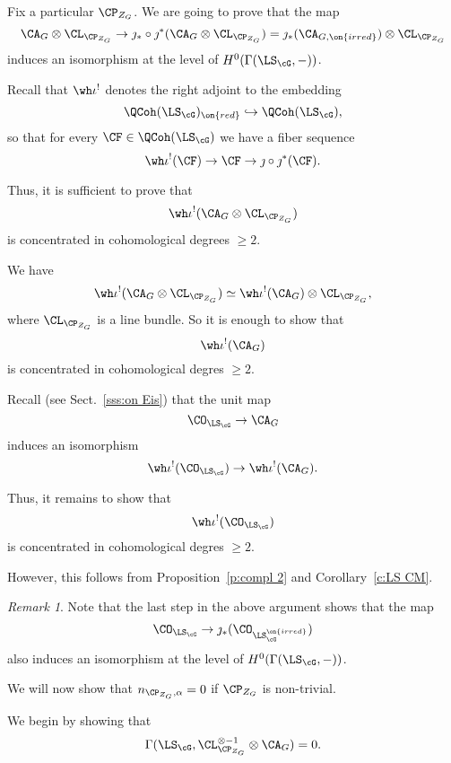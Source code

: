 \documentclass[9pt]{amsart}
\theoremstyle{remark}
\newtheorem{rem}[subsubsection]{Remark}
\theoremstyle{definition}
\theoremstyle{remark}
\newcommand{\secref}[1]{Sect.~\ref{#1}}
\newcommand{\propref}[1]{Proposition~\ref{#1}}
\newcommand{\corref}[1]{Corollary~\ref{#1}}
\numberwithin{equation}{section}
\begin{document}
\label{sss:step 1}

Fix a particular $\CP_{Z_G}$. We are going to prove that the map
$$\CA_G\otimes \CL_{\CP_{Z_G}}\to \jmath_*\circ \jmath^*(\CA_G\otimes \CL_{\CP_{Z_G}}) = 
\jmath_*(\CA_{G,\on{irred}}) \otimes \CL_{\CP_{Z_G}}$$
induces an isomorphism at the level of $H^0(\Gamma(\LS_\cG,-))$.

\medskip

Recall that $\wh\iota^!$ denotes the right adjoint to the embedding
$$\QCoh(\LS_\cG)_{\on{red}}\hookrightarrow \QCoh(\LS_\cG),$$
so that for every $\CF\in \QCoh(\LS_\cG)$ we have a fiber sequence
$$\wh\iota^!(\CF)\to \CF\to \jmath\circ \jmath^*(\CF).$$

Thus, it is sufficient to prove that 
$$\wh\iota^!(\CA_G\otimes \CL_{\CP_{Z_G}})$$
is concentrated in cohomological degrees $\geq 2$.

\medskip

We have
$$\wh\iota^!(\CA_G\otimes \CL_{\CP_{Z_G}})\simeq \wh\iota^!(\CA_G)\otimes \CL_{\CP_{Z_G}},$$
where $\CL_{\CP_{Z_G}}$ is a line bundle. So it is enough to show that 
$$\wh\iota^!(\CA_G)$$
is concentrated in cohomological degres $\geq 2$.

\medskip

Recall (see \secref{sss:on Eis}) that the unit map 
$$\CO_{\LS_\cG}\to \CA_G$$ 
induces an isomorphism 
$$\wh\iota^!(\CO_{\LS_\cG})\to \wh\iota^!(\CA_G).$$

Thus, it remains to show that 
$$\wh\iota^!(\CO_{\LS_\cG})$$
is concentrated in cohomological degres $\geq 2$.

\medskip

However, this follows from \propref{p:compl 2} and \corref{c:LS CM}.

\begin{rem}
Note that the last step in the above argument shows that the map
$$\CO_{\LS_\cG} \to \jmath_*(\CO_{\LS^{\on{irred}}_\cG})$$
also induces an isomorphism at the level of $H^0(\Gamma(\LS_\cG,-))$.
\end{rem} 

 \label{sss:step 2}

We will now show that $n_{\CP_{Z_G},\alpha}=0$ if $\CP_{Z_G}$ is non-trivial. 

\medskip 

We begin by showing that
\begin{equation}\label{eq:no Hom with L}
\Gamma(\LS_\cG,\CL^{\otimes -1}_{\CP_{Z_G}}\otimes \CA_G) = 0.
\end{equation}
\end{document}
